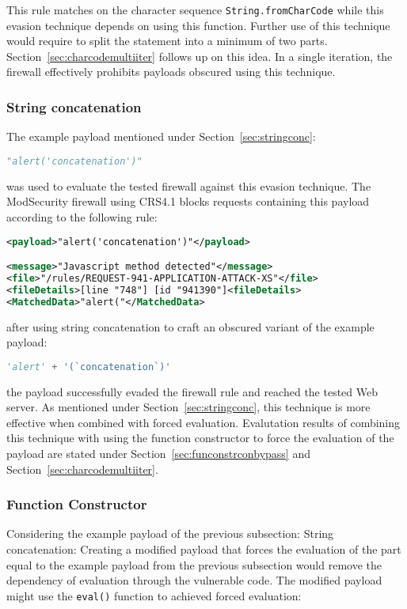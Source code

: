 This rule matches on the character sequence \verb|String.fromCharCode| while this evasion technique depends on using this function. Further use of this technique would require to split the statement into a minimum of two parts. Section~\ref{sec:charcodemultiiter} follows up on this idea. In a single iteration, the firewall effectively prohibits payloads obscured using this technique.

\subsubsection{String concatenation}
\label{sec:stringconcsingleiter}
The example payload mentioned under Section~\ref{sec:stringconc}:

\begin{lstlisting}[style=basicStyle, language=Python]
"alert('concatenation')"
\end{lstlisting}

was used to evaluate the tested firewall against this evasion technique. The ModSecurity firewall using CRS4.1 blocks requests containing this payload according to the following rule:

\begin{lstlisting}[style=ruleStyle, language=XML, caption=fromCharCode blocked, label={lst:fromcharcodeblocked}]
<payload>"alert('concatenation')"</payload>

<message>"Javascript method detected"</message>
<file>"/rules/REQUEST-941-APPLICATION-ATTACK-XS"</file>
<fileDetails>[line "748"] [id "941390"]<fileDetails>
<MatchedData>"alert("</MatchedData>
\end{lstlisting}

after using string concatenation to craft an obscured variant of the example payload:

\begin{lstlisting}[style=basicStyle, language=Python]
'alert' + '(`concatenation`)'
\end{lstlisting}

the payload successfully evaded the firewall rule and reached the tested Web server. As mentioned under Section~\ref{sec:stringconc}, this technique is more effective when combined with forced evaluation. Evalutation results of combining this technique with using the function constructor to force the evaluation of the payload are stated under Section~\ref{sec:funconstrconbypass} and Section~\ref{sec:charcodemultiiter}. 


\subsubsection{Function Constructor}
\label{sec:functionconstructorsingleeva}
Considering the example payload of the previous subsection: String concatenation: Creating a modified payload that forces the evaluation of the part equal to the example payload from the previous subsection would remove the dependency of evaluation through the vulnerable code. The modified payload might use the \verb|eval()| function to achieved forced evaluation:

